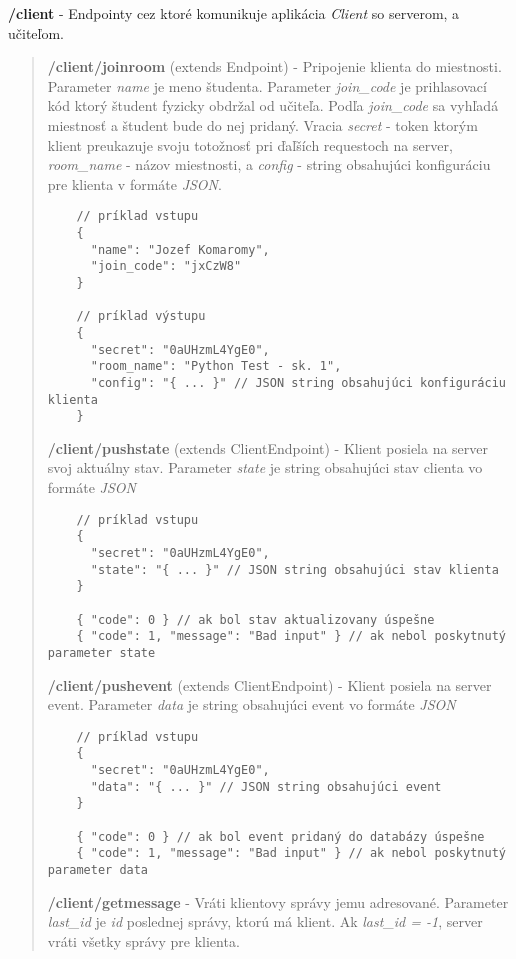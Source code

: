 \documentclass{article}
\newcommand{\filedesc}[1]{\vspace{0.3cm} \noindent \textbf{#1}}
\begin{document}
\filedesc{/client} - Endpointy cez ktoré komunikuje aplikácia \emph{Client} so serverom, a učiteľom.

\begin{quote}
  \filedesc{/client/joinroom} (extends Endpoint) - Pripojenie klienta do miestnosti. Parameter \emph{name} je meno študenta. Parameter \emph{join{\_}code} je prihlasovací kód ktorý študent fyzicky obdržal od učiteľa. Podľa \emph{join{\_}code} sa vyhľadá miestnosť a študent bude do nej pridaný. Vracia \emph{secret} - token ktorým klient preukazuje svoju totožnosť pri ďaľších requestoch na server, \emph{room{\_}name} - názov miestnosti, a \emph{config} - string obsahujúci konfiguráciu pre klienta v formáte \emph{JSON}.

  \begin{verbatim}
    // príklad vstupu
    {
      "name": "Jozef Komaromy",
      "join_code": "jxCzW8"
    }

    // príklad výstupu
    {
      "secret": "0aUHzmL4YgE0",
      "room_name": "Python Test - sk. 1",
      "config": "{ ... }" // JSON string obsahujúci konfiguráciu klienta
    }
  \end{verbatim}

  \filedesc{/client/pushstate} (extends ClientEndpoint) - Klient posiela na server svoj aktuálny stav. Parameter \emph{state} je string obsahujúci stav clienta vo formáte \emph{JSON}

  \begin{verbatim}
    // príklad vstupu
    {
      "secret": "0aUHzmL4YgE0",
      "state": "{ ... }" // JSON string obsahujúci stav klienta
    }

    { "code": 0 } // ak bol stav aktualizovany úspešne
    { "code": 1, "message": "Bad input" } // ak nebol poskytnutý parameter state
  \end{verbatim}
  
  \filedesc{/client/pushevent} (extends ClientEndpoint) - Klient posiela na server event. Parameter \emph{data} je string obsahujúci event vo formáte \emph{JSON}

  \begin{verbatim}
    // príklad vstupu
    {
      "secret": "0aUHzmL4YgE0",
      "data": "{ ... }" // JSON string obsahujúci event
    }

    { "code": 0 } // ak bol event pridaný do databázy úspešne
    { "code": 1, "message": "Bad input" } // ak nebol poskytnutý parameter data
  \end{verbatim}

  \filedesc{/client/getmessage} - Vráti klientovy správy jemu adresované. Parameter \emph{last{\_}id} je \emph{id} poslednej správy, ktorú má klient. Ak \emph{last{\_}id = -1}, server vráti všetky správy pre klienta.


\end{quote}
\end{document}

